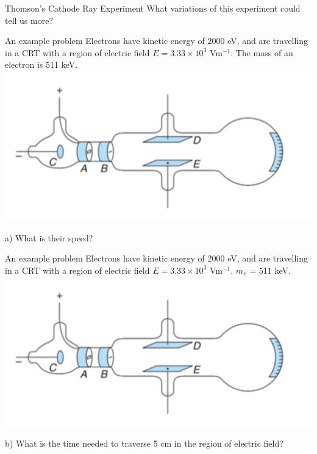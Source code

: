 \begin{frame}{Thomson's Cathode Ray Experiment}
\small
What variations of this experiment could tell us more?\\[20ex]

\end{frame}


\begin{frame}{An example problem}
\small
Electrons have kinetic energy of 2000 eV, and are travelling in a CRT with a region of electric field $E = 3.33 \times 10^3$ Vm$^{-1}$. The mass of an electron is 511 keV. \\[2ex]

\includegraphics[scale=0.2]{cathode1}



a) What is their speed?\\[18ex]


\end{frame}

\begin{frame}{An example problem}
\small
Electrons have kinetic energy of 2000 eV, and are travelling in a CRT with a region of electric field $E = 3.33 \times 10^3$ Vm$^{-1}$. $m_e$ = 511 keV.\\[2ex]

\includegraphics[scale=0.2]{cathode1}


b) What is the time needed to traverse 5 cm  in the region of electric field?\\[18ex]


\end{frame}






